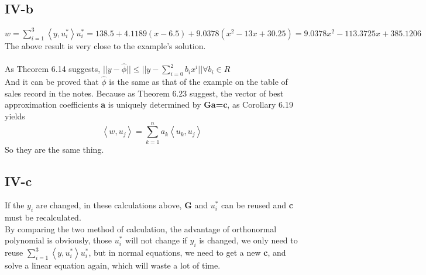 \documentclass[twoside,a4paper]{article}
\begin{document}
\subsection*{IV-b}
$w=\sum_{i=1}^{3}\left<y,u^{*}_i \right>u^{*}_i=138.5+4.1189(x-6.5)+9.0378(x^2-13x+30.25)= 9.0378x^2-113.3725x+ 385.1206$\\
The above result is very close to the example's solution.\\
\\
As Theorem 6.14 suggests, $||y-\hat{\phi}|| \le ||y-\sum_{i=0}^{2}b_i x^i|| \forall b_i \in R$\\
And it can be proved that $\hat{\phi}$ is the same as that of the example on the table of sales record in the notes. Because as Theorem 6.23 suggest, the vector of best approximation coefficients \textbf{a} is uniquely determined by \textbf{Ga=c}, as Corollary 6.19 yields $$ \left<w,u_j \right>=\sum_{k=1}^{n} a_k \left<u_k,u_j \right>$$
So they are the same thing.
\subsection*{IV-c}
If the $y_i$ are changed, in these calculations above, \textbf{G} and $u^{*}_i$ can be reused and \textbf{c} must be recalculated.\\
By comparing the two method of calculation, the advantage of orthonormal polynomial is obviously, those $u^{*}_i$ will not change if $y_i$ is changed, we only need to reuse $\sum_{i=1}^{3}\left<y,u^{*}_i \right>u^{*}_i$, but in normal equations, we need to get a new \textbf{c}, and solve a linear equation again, which will waste a lot of time.
\end{document}
